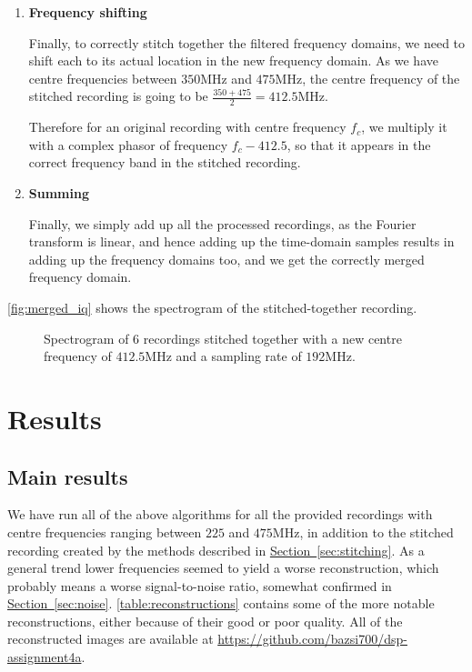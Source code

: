 \documentclass{article}
\newcommand{\sectionref}[1]{\hyperref[sec:#1]{Section~\ref*{sec:#1}}}
\begin{document}
\begin{enumerate}
    \item \textbf{Frequency shifting} \par 
    Finally, to correctly stitch together the filtered frequency domains, we need to shift each to its actual location in the new frequency domain. As we have centre frequencies between $350$MHz and $475$MHz, the centre frequency of the stitched recording is going to be $\frac{350 + 475}{2} = 412.5$MHz. 

    Therefore for an original recording with centre frequency $f_c$, we multiply it with a complex phasor of frequency $f_c - 412.5$, so that it appears in the correct frequency band in the stitched recording.

    \item \textbf{Summing} \par 
    Finally, we simply add up all the processed recordings, as the Fourier transform is linear, and hence adding up the time-domain samples results in adding up the frequency domains too, and we get the correctly merged frequency domain.
    
\end{enumerate}

\autoref{fig:merged_iq} shows the spectrogram of the stitched-together recording.

\begin{figure}[hbt]
    \centering
    
    \caption{Spectrogram of 6 recordings stitched together with a new centre frequency of $412.5$MHz and a sampling rate of $192$MHz.}
    \label{fig:merged_iq}
\end{figure}


\section{Results}
\label{sec:results}

\subsection{Main results}

We have run all of the above algorithms for all the provided recordings with centre frequencies ranging between $225$ and $475$MHz, in addition to the stitched recording created by the methods described in \sectionref{stitching}. As a general trend lower frequencies seemed to yield a worse reconstruction, which probably means a worse signal-to-noise ratio, somewhat confirmed in \sectionref{noise}. \autoref{table:reconstructions} contains some of the more notable reconstructions, either because of their good or poor quality. All of the reconstructed images are available at \url{https://github.com/bazsi700/dsp-assignment4a}.
\end{document}
